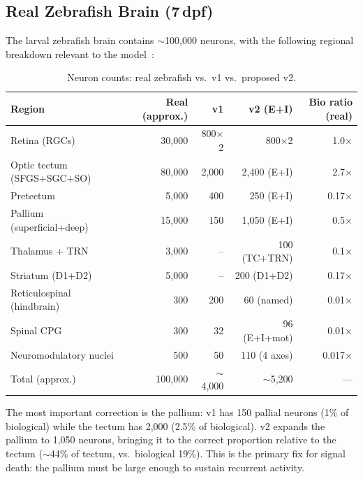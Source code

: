 \documentclass[11pt,a4paper]{article}
\begin{document}
\subsection{Real Zebrafish Brain (7\,dpf)}

The larval zebrafish brain contains $\sim$100,000 neurons, with the following
regional breakdown relevant to the model~\cite{ahrens2013,portugues2014,broglio2015}:

\begin{table}[H]
\centering
\caption{Neuron counts: real zebrafish vs.\ v1 vs.\ proposed v2.}
\label{tab:counts}
\begin{tabular}{lrrrr}
\toprule
Region & Real (approx.) & v1 & v2 (E+I) & Bio ratio (real) \\
\midrule
Retina (RGCs)              & 30,000  & 800$\times$2 & 800$\times$2    & 1.0$\times$ \\
Optic tectum (SFGS+SGC+SO) & 80,000  & 2,000        & 2,400 (E+I)     & 2.7$\times$ \\
Pretectum                  &  5,000  &   400        &   250 (E+I)     & 0.17$\times$ \\
Pallium (superficial+deep) & 15,000  &   150        & 1,050 (E+I)     & 0.5$\times$ \\
Thalamus + TRN             &  3,000  &    --        &   100 (TC+TRN)  & 0.1$\times$ \\
Striatum (D1+D2)           &  5,000  &    --        &   200 (D1+D2)   & 0.17$\times$ \\
Reticulospinal (hindbrain) &    300  &   200        &    60 (named)   & 0.01$\times$ \\
Spinal CPG                 &    300  &    32        &    96 (E+I+mot) & 0.01$\times$ \\
Neuromodulatory nuclei     &    500  &    50        &   110 (4 axes)  & 0.017$\times$ \\
\midrule
Total (approx.)            & 100,000 & $\sim$4,000  & $\sim$5,200     & --- \\
\bottomrule
\end{tabular}
\end{table}

\noindent The most important correction is the pallium: v1 has 150 pallial neurons
(1\% of biological) while the tectum has 2,000 (2.5\% of biological).
v2 expands the pallium to 1,050 neurons, bringing it to the correct
proportion relative to the tectum ($\sim$44\% of tectum, vs.\ biological 19\%).
This is the primary fix for signal death: the pallium must be large enough
to sustain recurrent activity.
\end{document}
